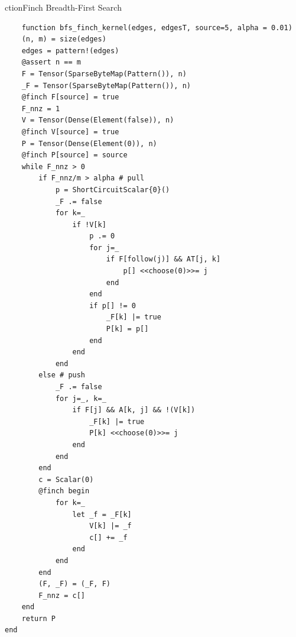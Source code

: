 ction{Finch Breadth-First Search}
\begin{verbatim}
    function bfs_finch_kernel(edges, edgesT, source=5, alpha = 0.01)
    (n, m) = size(edges)
    edges = pattern!(edges)
    @assert n == m
    F = Tensor(SparseByteMap(Pattern()), n)
    _F = Tensor(SparseByteMap(Pattern()), n)
    @finch F[source] = true
    F_nnz = 1 
    V = Tensor(Dense(Element(false)), n)
    @finch V[source] = true
    P = Tensor(Dense(Element(0)), n)
    @finch P[source] = source
    while F_nnz > 0 
        if F_nnz/m > alpha # pull
            p = ShortCircuitScalar{0}()
            _F .= false
            for k=_ 
                if !V[k]
                    p .= 0
                    for j=_ 
                        if F[follow(j)] && AT[j, k]
                            p[] <<choose(0)>>= j
                        end 
                    end 
                    if p[] != 0
                        _F[k] |= true
                        P[k] = p[] 
                    end 
                end 
            end
        else # push
            _F .= false
            for j=_, k=_ 
                if F[j] && A[k, j] && !(V[k])
                    _F[k] |= true
                    P[k] <<choose(0)>>= j
                end 
            end 
        end 
        c = Scalar(0)
        @finch begin
            for k=_ 
                let _f = _F[k]
                    V[k] |= _f
                    c[] += _f
                end 
            end 
        end 
        (F, _F) = (_F, F)
        F_nnz = c[] 
    end 
    return P
end
\end{verbatim}
